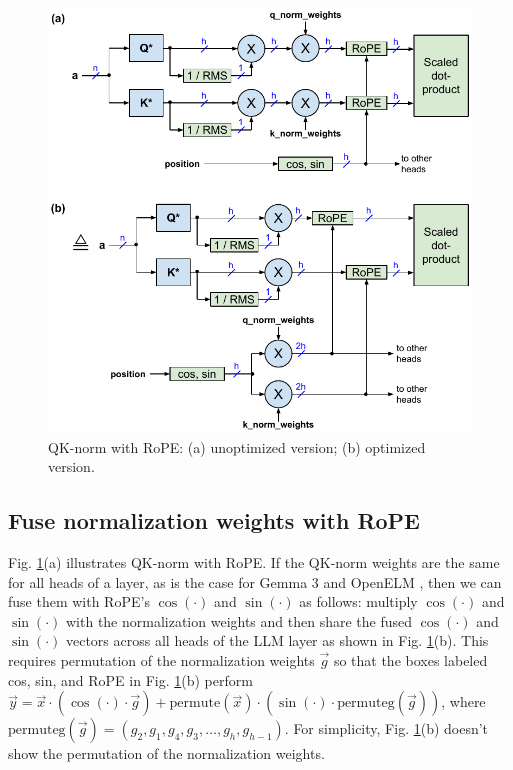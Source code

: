 \documentclass{article}
\def\vx{\vec{x}}                      %
\def\vy{\vec{y}}                      %
\def\vg{\vec{g}}                      %
\def\cosi{\cos{(\cdot)}}              %
\def\sini{\sin{(\cdot)}}              %
\begin{document}
\begin{figure}[h!] \centering
  \includegraphics[scale=0.9]{../doc/fig/flashNorm_fig7.pdf}
  \caption{QK-norm with RoPE: (a) unoptimized version; (b) optimized version.}
\label{fig7} \end{figure}

\subsection{Fuse normalization weights with RoPE}
Fig. \ref{fig7}(a) illustrates QK-norm with RoPE. If the QK-norm weights are the same for all heads of a layer, as is the case for Gemma 3 and  OpenELM \citep{gemma3, openelm}, then we can fuse them with RoPE's $\cosi$ and $\sini$ as follows: multiply $\cosi$ and $\sini$ with the normalization weights and then share the fused $\cosi$ and $\sini$ vectors across all heads of the LLM layer as shown in Fig. \ref{fig7}(b). This requires permutation of the normalization weights $\vg$ so that the boxes labeled cos, sin, and RoPE in Fig. \ref{fig7}(b) perform $\vy = \vx \cdot \left( \cosi \cdot \vg \right) + \text{permute}(\vx) \cdot \left( \sini \cdot \text{permuteg}(\vg) \right)$, where $\text{permuteg}(\vg) = (g_2, g_1, g_4, g_3, \dots, g_h, g_{h-1})$. For simplicity, Fig. \ref{fig7}(b) doesn't show the permutation of the normalization weights.
\end{document}
